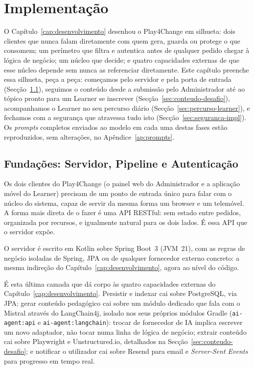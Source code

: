 %
%
\chapter{Implementação} \label{cap:implementacao}

O Capítulo~\ref{cap:desenvolvimento} desenhou o Play4Change em silhueta: dois clientes que nunca falam diretamente com quem gera, guarda ou protege o que consomem; um perímetro que filtra e autentica antes de qualquer pedido chegar à lógica de negócio; um núcleo que decide; e quatro capacidades externas de que esse núcleo depende sem nunca as referenciar diretamente. Este capítulo preenche essa silhueta, peça a peça: começamos pelo servidor e pela porta de entrada (Secção~\ref{sec:backend}), seguimos o conteúdo desde a submissão pelo Administrador até ao tópico pronto para um Learner se inscrever (Secção~\ref{sec:conteudo-desafio}), acompanhamos o Learner no seu percurso diário (Secção~\ref{sec:percurso-learner}), e fechamos com a segurança que atravessa tudo isto (Secção~\ref{sec:seguranca-impl}). Os \textit{prompts} completos enviados ao modelo em cada uma destas fases estão reproduzidos, sem alterações, no Apêndice~\ref{ap:prompts}.

\section{Fundações: Servidor, Pipeline e Autenticação} \label{sec:backend}

Os dois clientes do Play4Change (o painel web do Administrador e a aplicação móvel do Learner) precisam de um ponto de entrada único para falar com o núcleo do sistema, capaz de servir da mesma forma um browser e um telemóvel. A forma mais direta de o fazer é uma API RESTful: sem estado entre pedidos, organizada por recursos, e igualmente natural para os dois lados. É essa API que o servidor expõe.

O servidor é escrito em Kotlin sobre Spring Boot~3 (JVM~21), com as regras de negócio isoladas de Spring, JPA ou de qualquer fornecedor externo concreto: a mesma indireção do Capítulo~\ref{cap:desenvolvimento}, agora ao nível do código.

É esta última camada que dá corpo às quatro capacidades externas do Capítulo~\ref{cap:desenvolvimento}. Persistir e indexar cai sobre PostgreSQL, via JPA; gerar conteúdo pedagógico cai sobre um módulo dedicado que fala com o Mistral através do LangChain4j, isolado nos seus próprios módulos Gradle (\texttt{ai-agent:api} e \texttt{ai-agent:langchain}): trocar de fornecedor de IA implica escrever um novo adaptador, não tocar numa linha de lógica de negócio; extrair conteúdo cai sobre Playwright e Unstructured.io, detalhados na Secção~\ref{sec:conteudo-desafio}; e notificar o utilizador cai sobre Resend para email e \textit{Server-Sent Events} para progresso em tempo real.

